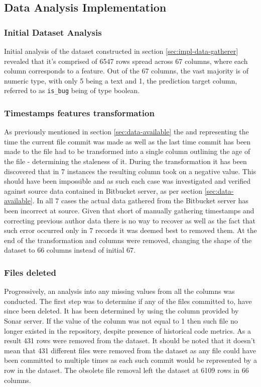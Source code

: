 \subsection{Data Analysis Implementation}\label{sec:impl-data-analysis}
\subsubsection{Initial Dataset Analysis}
Initial analysis of the dataset constructed in section \ref{sec:impl-data-gatherer} revealed that it's comprised of 6547 rows spread across 67 columns, where each column corresponds to a feature. Out of the 67 columns, the vast majority is of numeric type, with only 5 being a text and 1, the prediction target column, referred to as \texttt{is\_bug} being of type boolean.

\subsubsection{Timestamps features transformation}\label{sec:impl-data-analysis:make-file-age}
As previously mentioned in section \ref{sec:data-available} the \timestamp{} and \prevTimestamp{} representing the time the current file commit was made as well as the last time commit has been made to the file had to be transformed into a single column outlining the age of the file - determining the staleness of it.
During the transformation it has been discovered that in 7 instances the resulting column took on a negative value. This should have been impossible and as such each case was investigated and verified against source data contained in Bitbucket server, as per section \ref{sec:data-available}. In all 7 cases the actual data gathered from the Bitbucket server has been incorrect at source. Given that short of manually gathering timestamps and correcting previous author data there is no way to recover as well as the fact that such error occurred only in 7 records it was deemed best to removed them.
At the end of the transformation \timestamp{} and \prevTimestamp{} columns were removed, changing the shape of the dataset to 66 columns instead of initial 67.

\subsubsection{Files deleted}\label{sec:impl-data-analysis:files-deleted}
Progressively, an analysis into any missing values from all the columns was conducted. The first step was to determine if any of the files committed to, have since been deleted. It has been determined by using the \files column provided by Sonar server. If the value of the column was not equal to 1 then such file no longer existed in the repository, despite presence of historical code metrics. As a result 431 rows were removed from the dataset. It should be noted that it doesn't mean that 431 different files were removed from the dataset as any file could have been committed to multiple times as each such commit would be represented by a row in the dataset. The obsolete file removal left the dataset at 6109 rows in 66 columns.

